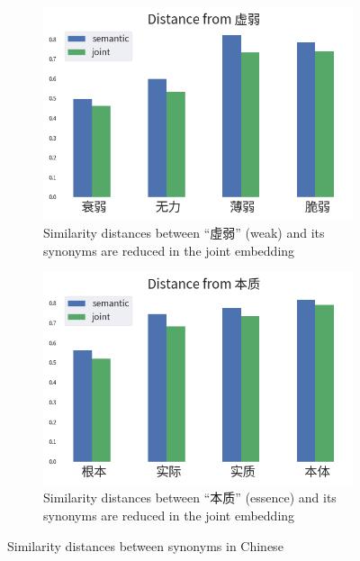\begin{figure}[h!]
\begin{CJK}{UTF8}{gbsn}
\begin{subfigure}[b]{0.46\textwidth}
        \label{fig:similarity_zh2}
    \end{subfigure}
    \begin{subfigure}[b]{0.46\textwidth}
        \centering
        \includegraphics[width=\textwidth]{../images/similarity_zh3.png}
        \caption{Similarity distances between ``虛弱'' (weak) and its synonyms are reduced in the joint embedding}
        \label{fig:similarity_zh3}
    \end{subfigure}
    \hspace{2em}
    \begin{subfigure}[b]{0.46\textwidth}
        \centering
        \includegraphics[width=\textwidth]{../images/similarity_zh4.png}
        \caption{Similarity distances between ``本质'' (essence) and its synonyms are reduced in the joint embedding}
        \label{fig:similarity_zh4}
    \end{subfigure}
    \caption{Similarity distances between synonyms in Chinese}
	\label{fig:similarity_zh}
\end{CJK}
\end{figure}

